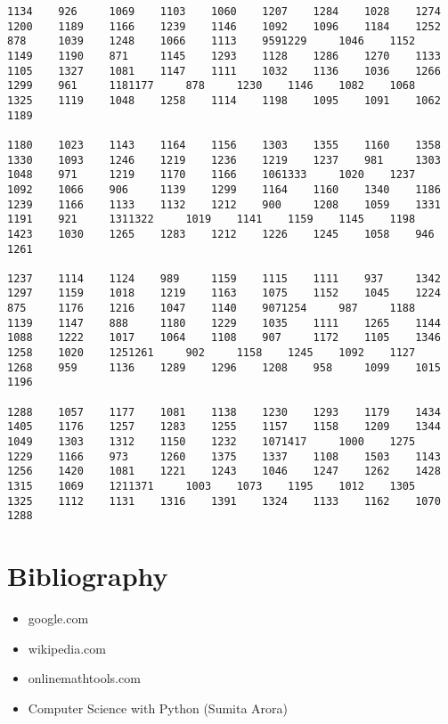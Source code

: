 \begin{verbatim}
1134    926     1069    1103    1060    1207    1284    1028    1274    1200    1189    1166    1239    1146    1092    1096    1184    1252    878     1039    1248    1066    1113    9591229     1046    1152    1149    1190    871     1145    1293    1128    1286    1270    1133    1105    1327    1081    1147    1111    1032    1136    1036    1266    1299    961     1181177     878     1230    1146    1082    1068    1325    1119    1048    1258    1114    1198    1095    1091    1062    1189

1180    1023    1143    1164    1156    1303    1355    1160    1358    1330    1093    1246    1219    1236    1219    1237    981     1303    1048    971     1219    1170    1166    1061333     1020    1237    1092    1066    906     1139    1299    1164    1160    1340    1186    1239    1166    1133    1132    1212    900     1208    1059    1331    1191    921     1311322     1019    1141    1159    1145    1198    1423    1030    1265    1283    1212    1226    1245    1058    946     1261

1237    1114    1124    989     1159    1115    1111    937     1342    1297    1159    1018    1219    1163    1075    1152    1045    1224    875     1176    1216    1047    1140    9071254     987     1188    1139    1147    888     1180    1229    1035    1111    1265    1144    1088    1222    1017    1064    1108    907     1172    1105    1346    1258    1020    1251261     902     1158    1245    1092    1127    1268    959     1136    1289    1296    1208    958     1099    1015    1196

1288    1057    1177    1081    1138    1230    1293    1179    1434    1405    1176    1257    1283    1255    1157    1158    1209    1344    1049    1303    1312    1150    1232    1071417     1000    1275    1229    1166    973     1260    1375    1337    1108    1503    1143    1256    1420    1081    1221    1243    1046    1247    1262    1428    1315    1069    1211371     1003    1073    1195    1012    1305    1325    1112    1131    1316    1391    1324    1133    1162    1070    1288
\end{verbatim}
\newpage
\section{Bibliography}
\begin{itemize}
	\item google.com
	\item wikipedia.com
	\item onlinemathtools.com
	\item Computer Science with Python (Sumita Arora)
\end{itemize}
